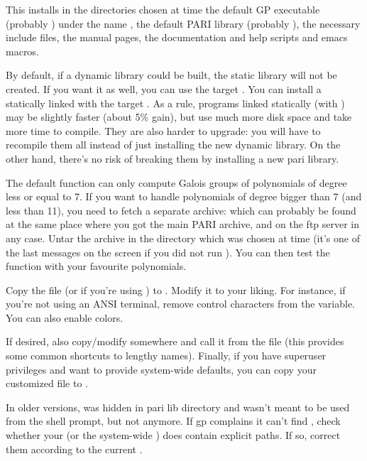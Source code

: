This installs in the directories chosen at  time the default
GP executable (probably ) under the name , the default
PARI library (probably ), the necessary include files, the
manual pages, the documentation and help scripts and emacs macros.

By default, if a dynamic library  could be built, the static
library  will not be created. If you want it as well, you can
use the target . You can install a statically
linked  with the target . As a rule,
programs linked statically (with ) may be slightly faster
(about 5\% gain), but use much more disk space and take more time to compile.
They are also harder to upgrade: you will have to recompile them all instead
of just installing the new dynamic library. On the other hand, there's no
risk of breaking them by installing a new pari library.

 The default  function can only
compute Galois groups of polynomials of degree less or equal to 7. If you
want to handle polynomials of degree bigger than 7 (and less than 11), you
need to fetch a separate archive:  which can probably be
found at the same place where you got the main PARI archive, and on the
 ftp server in any case. Untar the archive in the 
directory which was chosen at  time (it's one of the last
messages on the screen if you did not run ). You can then
test the  function with your favourite polynomials.

 Copy the file  (or
 if you're using ) to . Modify
it to your liking. For instance, if you're not using an ANSI terminal,
remove control characters from the  variable. You can also
enable colors. 

If desired, also copy/modify  somewhere and call it from
the  file (this provides some common shortcuts to lengthy names).
Finally, if you have superuser privileges and want to provide system-wide
defaults, you can copy your customized  file to .

In older versions,  was hidden in pari lib directory and wasn't
meant to be used from the shell prompt, but not anymore. If gp complains it
can't find , check whether your  (or the system-wide
) does contain explicit paths. If so, correct them according to the
current .


